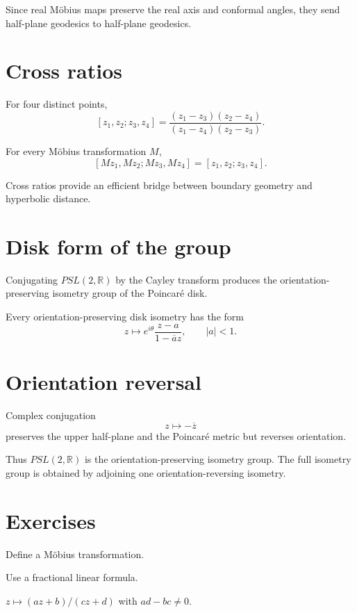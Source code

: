 Since real Möbius maps preserve the real axis and conformal angles, they send
half-plane geodesics to half-plane geodesics.

\section{Cross ratios}

\begin{definition}\label{def:vii33-cross-ratio}
For four distinct points,
\[
[z_1,z_2;z_3,z_4]
=
\frac{(z_1-z_3)(z_2-z_4)}
{(z_1-z_4)(z_2-z_3)}.
\]
\end{definition}

\begin{theorem}\label{thm:vii33-cross-invariance}
For every Möbius transformation \(M\),
\[
[Mz_1,Mz_2;Mz_3,Mz_4]
=
[z_1,z_2;z_3,z_4].
\]
\end{theorem}

Cross ratios provide an efficient bridge between boundary geometry and
hyperbolic distance.

\section{Disk form of the group}

Conjugating \(PSL(2,\mathbb R)\) by the Cayley transform produces the
orientation-preserving isometry group of the Poincaré disk.

\begin{proposition}\label{prop:vii33-disk-auto}
Every orientation-preserving disk isometry has the form
\[
z\longmapsto
e^{i\theta}
\frac{z-a}{1-\overline a z},
\qquad
|a|<1.
\]
\end{proposition}

\section{Orientation reversal}

Complex conjugation
\[
z\mapsto-\overline z
\]
preserves the upper half-plane and the Poincaré metric but reverses orientation.

\begin{remark}
Thus \(PSL(2,\mathbb R)\) is the orientation-preserving isometry group.  The full
isometry group is obtained by adjoining one orientation-reversing isometry.
\end{remark}

\section{Exercises}
\begin{exercise}\label{exr:vii33-01}
Define a Möbius transformation.
\end{exercise}
\begin{hint}
Use a fractional linear formula.
\end{hint}
\begin{solution}
\(z\mapsto(az+b)/(cz+d)\) with \(ad-bc\ne0\).
\end{solution}

